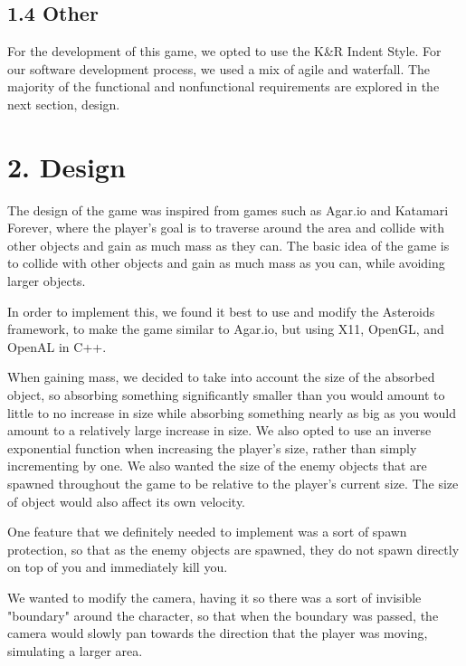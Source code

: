 \documentclass[12pt]{report}
\begin{document}
\subsection*{1.4 Other}
For the development of this game, we opted to use the K\&R Indent Style. For our software development process, we used a mix of agile and waterfall. The majority of the functional and nonfunctional requirements are explored in the next section, design.

\newpage
\section*{2. Design}

The design of the game was inspired from games such as Agar.io and Katamari Forever, where the player's goal is to traverse around the area and collide with other objects and gain as much mass as they can. The basic idea of the game is to collide with other objects and gain as much mass as you can, while avoiding larger objects. \bigskip

In order to implement this, we found it best to use and modify the Asteroids framework, to make the game similar to Agar.io, but using X11, OpenGL, and OpenAL in C++. \bigskip

When gaining mass, we decided to take into account the size of the absorbed object, so absorbing something significantly smaller than you would amount to little to no increase in size while absorbing something nearly as big as you would amount to a relatively large increase in size. We also opted to use an inverse exponential function when increasing the player's size, rather than simply incrementing by one. We also wanted the size of the enemy objects that are spawned throughout the game to be relative to the player's current size. The size of object would also affect its own velocity. \bigskip

One feature that we definitely needed to implement was a sort of spawn protection, so that as the enemy objects are spawned, they do not spawn directly on top of you and immediately kill you. \bigskip

We wanted to modify the camera, having it so there was a sort of invisible "boundary" around the character, so that when the boundary was passed, the camera would slowly pan towards the direction that the player was moving, simulating a larger area. \bigskip
\end{document}

